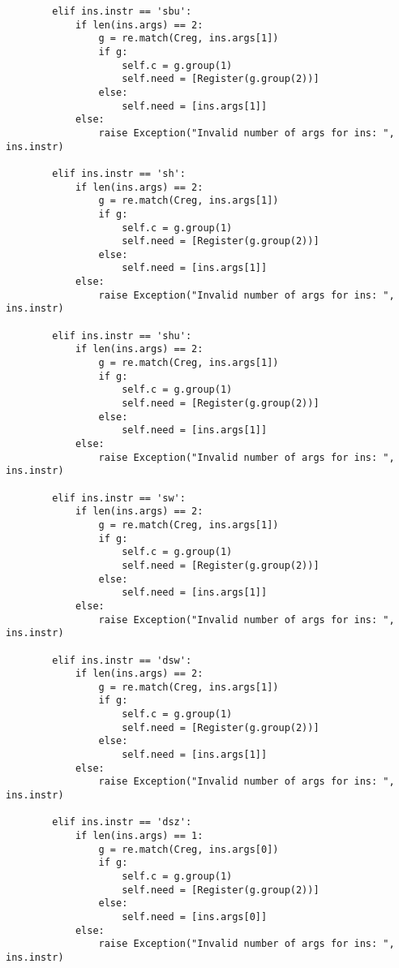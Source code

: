 \begin{lstlisting}
        elif ins.instr == 'sbu':  
            if len(ins.args) == 2:
                g = re.match(Creg, ins.args[1])
                if g:
                    self.c = g.group(1)
                    self.need = [Register(g.group(2))]
                else:
                    self.need = [ins.args[1]]
            else:
                raise Exception("Invalid number of args for ins: ", ins.instr) 
                                       
        elif ins.instr == 'sh':   
            if len(ins.args) == 2:
                g = re.match(Creg, ins.args[1])
                if g:
                    self.c = g.group(1)
                    self.need = [Register(g.group(2))]
                else:
                    self.need = [ins.args[1]]
            else:
                raise Exception("Invalid number of args for ins: ", ins.instr) 
                                       
        elif ins.instr == 'shu':  
            if len(ins.args) == 2:
                g = re.match(Creg, ins.args[1])
                if g:
                    self.c = g.group(1)
                    self.need = [Register(g.group(2))]
                else:
                    self.need = [ins.args[1]]
            else:
                raise Exception("Invalid number of args for ins: ", ins.instr) 
                                        
        elif ins.instr == 'sw':   
            if len(ins.args) == 2:
                g = re.match(Creg, ins.args[1])
                if g:
                    self.c = g.group(1)
                    self.need = [Register(g.group(2))]
                else:
                    self.need = [ins.args[1]] 
            else:
                raise Exception("Invalid number of args for ins: ", ins.instr) 
                                      
        elif ins.instr == 'dsw':  
            if len(ins.args) == 2:
                g = re.match(Creg, ins.args[1])
                if g:
                    self.c = g.group(1)
                    self.need = [Register(g.group(2))]
                else:
                    self.need = [ins.args[1]] 
            else:
                raise Exception("Invalid number of args for ins: ", ins.instr) 
                                     
        elif ins.instr == 'dsz':  
            if len(ins.args) == 1:
                g = re.match(Creg, ins.args[0])
                if g:
                    self.c = g.group(1)
                    self.need = [Register(g.group(2))]
                else:
                    self.need = [ins.args[0]]  
            else:
                raise Exception("Invalid number of args for ins: ", ins.instr) 
                                    

\end{lstlisting}
